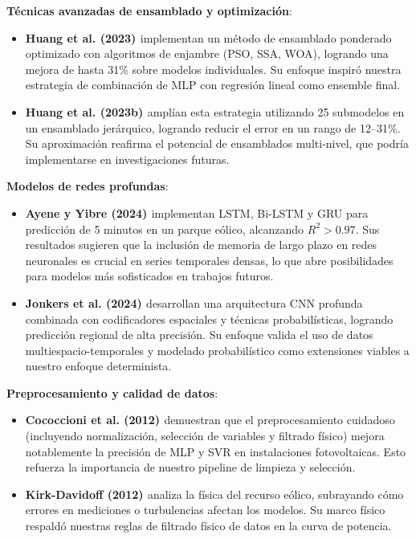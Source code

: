 \documentclass[conference]{IEEEtran}
\begin{document}
	\vspace{0.3cm}
	
	\textbf{Técnicas avanzadas de ensamblado y optimización}:
	\begin{itemize}[leftmargin=*,itemsep=1pt]
		\item \textbf{Huang et al. (2023) \cite{huang2023ensemble}} implementan un método de ensamblado ponderado optimizado con algoritmos de enjambre (PSO, SSA, WOA), logrando una mejora de hasta 31\% sobre modelos individuales. Su enfoque inspiró nuestra estrategia de combinación de MLP con regresión lineal como ensemble final.
		\item \textbf{Huang et al. (2023b) \cite{huang2023multiobjective}} amplían esta estrategia utilizando 25 submodelos en un ensamblado jerárquico, logrando reducir el error en un rango de 12–31\%. Su aproximación reafirma el potencial de ensamblados multi-nivel, que podría implementarse en investigaciones futuras.
	\end{itemize}
	
	\vspace{0.3cm}
	
	\textbf{Modelos de redes profundas}:
	\begin{itemize}[leftmargin=*,itemsep=1pt]
		\item \textbf{Ayene y Yibre (2024) \cite{ayene2024wind}} implementan LSTM, Bi-LSTM y GRU para predicción de 5 minutos en un parque eólico, alcanzando \(R^2 > 0.97\). Sus resultados sugieren que la inclusión de memoria de largo plazo en redes neuronales es crucial en series temporales densas, lo que abre posibilidades para modelos más sofisticados en trabajos futuros.
		\item \textbf{Jonkers et al. (2024) \cite{jonkers2024probabilistic}} desarrollan una arquitectura CNN profunda combinada con codificadores espaciales y técnicas probabilísticas, logrando predicción regional de alta precisión. Su enfoque valida el uso de datos multiespacio-temporales y modelado probabilístico como extensiones viables a nuestro enfoque determinista.
	\end{itemize}
	
	\vspace{0.3cm}
	
	\textbf{Preprocesamiento y calidad de datos}:
	\begin{itemize}[leftmargin=*,itemsep=1pt]
		\item \textbf{Cococcioni et al. (2012) \cite{cococcioni2012oneday}} demuestran que el preprocesamiento cuidadoso (incluyendo normalización, selección de variables y filtrado físico) mejora notablemente la precisión de MLP y SVR en instalaciones fotovoltaicas. Esto refuerza la importancia de nuestro pipeline de limpieza y selección.
		\item \textbf{Kirk-Davidoff (2012) \cite{kirk2012forecasting}} analiza la física del recurso eólico, subrayando cómo errores en mediciones o turbulencias afectan los modelos. Su marco físico respaldó nuestras reglas de filtrado físico de datos en la curva de potencia.
	\end{itemize}
	
\end{document}
